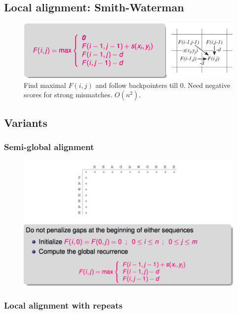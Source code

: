 \subsection{Local alignment: Smith-Waterman}

\begin{figure}[htp]
	\centering
	\includegraphics[scale=0.4]{images/11_local.png}
 	\caption{Find maximal $F(i,j)$ and follow backpointers till 0. Need negative scores for strong mismatches. $O(n^2)$.}
\end{figure}

\subsection{Variants}

\subsubsection{Semi-global alignment}
\begin{figure}[H]
	\centering
	\includegraphics[scale=0.4]{images/12_semi.png}
\end{figure}

\subsubsection{Local alignment with repeats}


